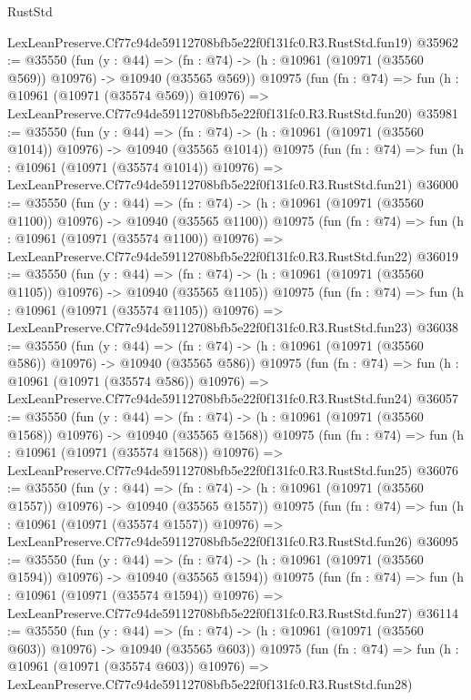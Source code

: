 \begin{lexlean}{RustStd}
\begin{coremodule}
    LexLeanPreserve.Cf77c94de59112708bfb5e22f0f131fc0.R3.RustStd.fun19)
@35962 := @35550
    (fun (y : @44) =>
    (fn : @74) -> (h : @10961 (@10971 (@35560 @569)) @10976) -> @10940 (@35565 @569))
    @10975
    (fun (fn : @74) =>
    fun (h : @10961 (@10971 (@35574 @569)) @10976) =>
    LexLeanPreserve.Cf77c94de59112708bfb5e22f0f131fc0.R3.RustStd.fun20)
@35981 := @35550
    (fun (y : @44) =>
    (fn : @74) -> (h : @10961 (@10971 (@35560 @1014)) @10976) -> @10940 (@35565 @1014))
    @10975
    (fun (fn : @74) =>
    fun (h : @10961 (@10971 (@35574 @1014)) @10976) =>
    LexLeanPreserve.Cf77c94de59112708bfb5e22f0f131fc0.R3.RustStd.fun21)
@36000 := @35550
    (fun (y : @44) =>
    (fn : @74) -> (h : @10961 (@10971 (@35560 @1100)) @10976) -> @10940 (@35565 @1100))
    @10975
    (fun (fn : @74) =>
    fun (h : @10961 (@10971 (@35574 @1100)) @10976) =>
    LexLeanPreserve.Cf77c94de59112708bfb5e22f0f131fc0.R3.RustStd.fun22)
@36019 := @35550
    (fun (y : @44) =>
    (fn : @74) -> (h : @10961 (@10971 (@35560 @1105)) @10976) -> @10940 (@35565 @1105))
    @10975
    (fun (fn : @74) =>
    fun (h : @10961 (@10971 (@35574 @1105)) @10976) =>
    LexLeanPreserve.Cf77c94de59112708bfb5e22f0f131fc0.R3.RustStd.fun23)
@36038 := @35550
    (fun (y : @44) =>
    (fn : @74) -> (h : @10961 (@10971 (@35560 @586)) @10976) -> @10940 (@35565 @586))
    @10975
    (fun (fn : @74) =>
    fun (h : @10961 (@10971 (@35574 @586)) @10976) =>
    LexLeanPreserve.Cf77c94de59112708bfb5e22f0f131fc0.R3.RustStd.fun24)
@36057 := @35550
    (fun (y : @44) =>
    (fn : @74) -> (h : @10961 (@10971 (@35560 @1568)) @10976) -> @10940 (@35565 @1568))
    @10975
    (fun (fn : @74) =>
    fun (h : @10961 (@10971 (@35574 @1568)) @10976) =>
    LexLeanPreserve.Cf77c94de59112708bfb5e22f0f131fc0.R3.RustStd.fun25)
@36076 := @35550
    (fun (y : @44) =>
    (fn : @74) -> (h : @10961 (@10971 (@35560 @1557)) @10976) -> @10940 (@35565 @1557))
    @10975
    (fun (fn : @74) =>
    fun (h : @10961 (@10971 (@35574 @1557)) @10976) =>
    LexLeanPreserve.Cf77c94de59112708bfb5e22f0f131fc0.R3.RustStd.fun26)
@36095 := @35550
    (fun (y : @44) =>
    (fn : @74) -> (h : @10961 (@10971 (@35560 @1594)) @10976) -> @10940 (@35565 @1594))
    @10975
    (fun (fn : @74) =>
    fun (h : @10961 (@10971 (@35574 @1594)) @10976) =>
    LexLeanPreserve.Cf77c94de59112708bfb5e22f0f131fc0.R3.RustStd.fun27)
@36114 := @35550
    (fun (y : @44) =>
    (fn : @74) -> (h : @10961 (@10971 (@35560 @603)) @10976) -> @10940 (@35565 @603))
    @10975
    (fun (fn : @74) =>
    fun (h : @10961 (@10971 (@35574 @603)) @10976) =>
    LexLeanPreserve.Cf77c94de59112708bfb5e22f0f131fc0.R3.RustStd.fun28)

\end{coremodule}
\end{lexlean}
